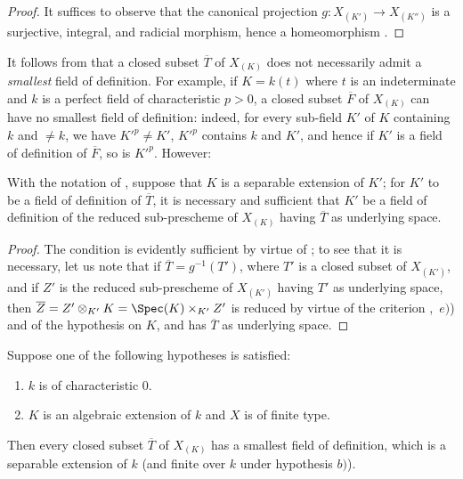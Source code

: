 \begin{proof}
It suffices to observe that the canonical projection $g:X_{(K')}\to X_{(K'')}$ is a surjective, integral, and radicial morphism, hence a homeomorphism .
\end{proof}

\begin{remark}[4.9.3]
\label{IV.4.9.3}
It follows from  that a closed subset $\overline{T}$ of $X_{(K)}$ does not necessarily admit a \emph{smallest} field of definition.
For example, if $K=k(t)$ where $t$ is an indeterminate and $k$ is a perfect field of characteristic $p>0$, a closed subset $\overline{F}$ of $X_{(K)}$ can have no smallest field of definition: indeed, for every sub-field $K'$ of $K$ containing $k$ and $\neq k$, we have $K'^p\neq K'$, $K'^p$ contains $k$ and $K'$,
and hence if $K'$ is a field of definition of $\overline{F}$, so is $K'^p$.
However:
\end{remark}

\begin{proposition}[4.9.4]
\label{IV.4.9.4}
With the notation of , suppose that $K$ is a separable extension of $K'$; for $K'$ to be a field of definition of $\overline{T}$, it is necessary and sufficient that $K'$ be a field of definition of the reduced sub-prescheme of $X_{(K)}$ having $\overline{T}$ as underlying space.
\end{proposition}

\begin{proof}
The condition is evidently sufficient by virtue of ; to see that it is necessary, let us note that if $\overline{T}=g^{-1}(T')$, where $T'$ is a closed subset of $X_{(K')}$, and if $Z'$ is the reduced sub-prescheme of $X_{(K')}$ having $T'$ as underlying space, then $\overline{Z}=Z'\otimes_{K'} K=\Spec(K)\times_{K'} Z'$ is reduced by virtue of the criterion ,~$e)$) and of the hypothesis on $K$, and has $\overline{T}$ as underlying space.
\end{proof}

\begin{corollary}[4.9.5]
\label{IV.4.9.5}
Suppose one of the following hypotheses is satisfied:
\begin{enumerate}[label=\emph{\alph*)}]
  \item $k$ is of characteristic $0$.
  \item $K$ is an algebraic extension of $k$ and $X$ is of finite type.
\end{enumerate}
Then every closed subset $\overline{T}$ of $X_{(K)}$ has a smallest field of definition, which is a separable extension of $k$ (and finite over $k$ under hypothesis $b)$).
\end{corollary}

